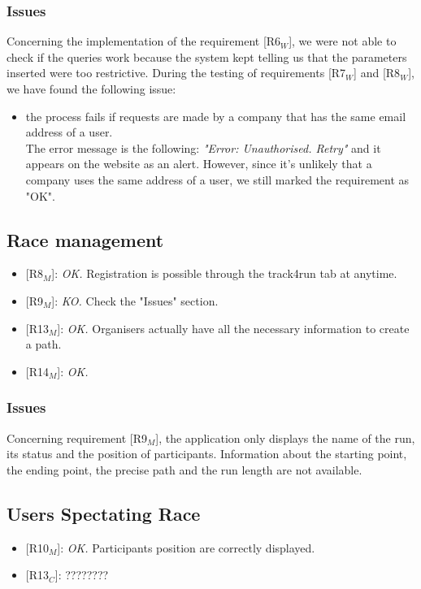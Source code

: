 \documentclass{article}
\begin{document}
\subsubsection{Issues}
Concerning the implementation of the requirement {[R6$_W$]}, we were not able to check if the queries work because the system kept telling us that the parameters inserted were too restrictive.\newline
During the testing of requirements {[R7$_W$]} and {[R8$_W$]}, we have found the following issue:
\begin{itemize}
	\item the process fails if requests are made by a company that has the same email address of a user. \\The error message is the following: \textit{"Error: Unauthorised. Retry"} and it appears on the website as an alert. However, since it's unlikely that a company uses the same address of a user, we still marked the requirement as "OK".
\end{itemize}

\subsection{Race management}
\begin{itemize}
	\item {[R8$_M$]}: \textit{OK.} Registration is possible through the track4run tab at anytime.
	\item {[R9$_M$]}: \textit{KO.} Check the "Issues" section.
	\item {[R13$_M$]}: \textit{OK.} Organisers actually have all the necessary information to create a path.
	\item {[R14$_M$]}: \textit{OK.}
\end{itemize}

\subsubsection{Issues}
Concerning requirement {[R9$_M$]}, the application only displays the name of the run, its status and the position of participants. Information about the starting point, the ending point, the precise path and the run length are not available.

\subsection{Users Spectating Race}
\begin{itemize}
	\item {[R10$_M$]}: \textit{OK.} Participants position are correctly displayed.
	\item {[R13$_C$]}: ????????
\end{itemize}
\end{document}
